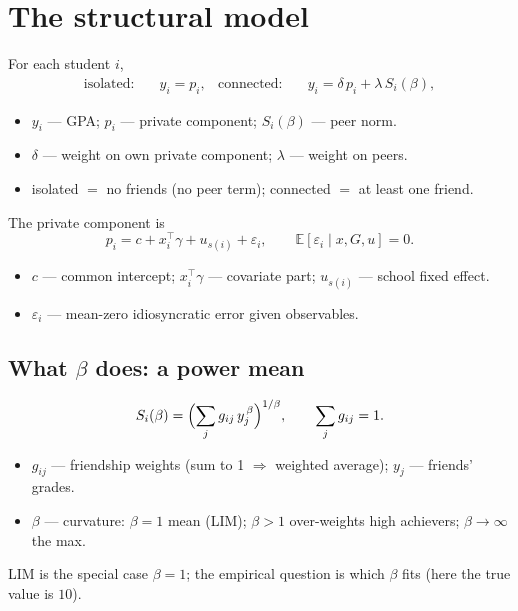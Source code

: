 \documentclass[11pt]{article}
\newcommand{\E}{\mathbb{E}}
\newcommand{\T}{^{\!\top}}
\newenvironment{where}{\par\nobreak\vspace{-0.2em}\begin{itemize}[leftmargin=1.5em,itemsep=1pt,topsep=2pt,parsep=0pt,label=\textcolor{accent}{\textbullet}]\small}{\end{itemize}\vspace{0.2em}}
\begin{document}
\section{The structural model}
For each student $i$,
\begin{align}
\text{isolated:}\quad & y_i = p_i, &
\text{connected:}\quad & y_i = \delta\,p_i + \lambda\,S_i(\beta),
\end{align}
\begin{where}
\item $y_i$ --- GPA; $p_i$ --- private component; $S_i(\beta)$ --- peer norm.
\item $\delta$ --- weight on own private component; $\lambda$ --- weight on peers.
\item isolated $=$ no friends (no peer term); connected $=$ at least one friend.
\end{where}
The private component is
\begin{equation}
p_i = c + x_i\T\gamma + u_{s(i)} + \varepsilon_i, \qquad \E[\varepsilon_i\mid x,G,u]=0 .
\end{equation}
\begin{where}
\item $c$ --- common intercept; $x_i\T\gamma$ --- covariate part; $u_{s(i)}$ --- school fixed effect.
\item $\varepsilon_i$ --- mean-zero idiosyncratic error given observables.
\end{where}

\subsection{What $\beta$ does: a power mean}
\begin{equation}
S_i(\beta)=\Bigl(\sum_j g_{ij}\,y_j^{\,\beta}\Bigr)^{1/\beta},\qquad \sum_j g_{ij}=1 .
\end{equation}
\begin{where}
\item $g_{ij}$ --- friendship weights (sum to 1 $\Rightarrow$ weighted average); $y_j$ --- friends' grades.
\item $\beta$ --- curvature: $\beta=1$ mean (LIM); $\beta>1$ over-weights high achievers; $\beta\to\infty$ the max.
\end{where}
LIM is the special case $\beta=1$; the empirical question is which $\beta$ fits (here the true value is $10$).
\end{document}
